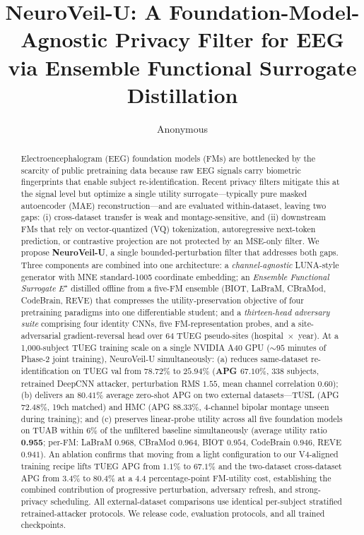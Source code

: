 \documentclass{article}
\title{NeuroVeil-U: A Foundation-Model-Agnostic Privacy Filter for EEG\\via Ensemble Functional Surrogate Distillation}
\author{Anonymous}
\newcommand{\Estar}{E^{\star}}
\begin{document}
\maketitle

\begin{abstract}
Electroencephalogram (EEG) foundation models (FMs) are bottlenecked by the scarcity of public pretraining data because raw EEG signals carry biometric fingerprints that enable subject re-identification. Recent privacy filters mitigate this at the signal level but optimize a single utility surrogate---typically pure masked autoencoder (MAE) reconstruction---and are evaluated within-dataset, leaving two gaps: (i) cross-dataset transfer is weak and montage-sensitive, and (ii) downstream FMs that rely on vector-quantized (VQ) tokenization, autoregressive next-token prediction, or contrastive projection are not protected by an MSE-only filter. We propose \textbf{NeuroVeil-U}, a single bounded-perturbation filter that addresses both gaps. Three components are combined into one architecture: a \emph{channel-agnostic} LUNA-style generator with MNE standard-1005 coordinate embedding; an \emph{Ensemble Functional Surrogate} $\Estar$ distilled offline from a five-FM ensemble (BIOT, LaBraM, CBraMod, CodeBrain, REVE) that compresses the utility-preservation objective of four pretraining paradigms into one differentiable student; and a \emph{thirteen-head adversary suite} comprising four identity CNNs, five FM-representation probes, and a site-adversarial gradient-reversal head over 64 TUEG pseudo-sites (hospital~$\times$~year). At a 1{,}000-subject TUEG training scale on a single NVIDIA A40 GPU ($\sim\!95$ minutes of Phase-2 joint training), NeuroVeil-U simultaneously: (a) reduces same-dataset re-identification on TUEG val from $78.72\%$ to $25.94\%$ (\textbf{APG $\mathbf{67.10\%}$}, 338 subjects, retrained DeepCNN attacker, perturbation RMS $1.55$, mean channel correlation $0.60$); (b) delivers an $\mathbf{80.41\%}$ average zero-shot APG on two external datasets---TUSL (APG $72.48\%$, 19ch matched) and HMC (APG $\mathbf{88.33\%}$, 4-channel bipolar montage unseen during training); and (c) preserves linear-probe utility across all five foundation models on TUAB within $6\%$ of the unfiltered baseline simultaneously (average utility ratio \textbf{0.955}; per-FM: LaBraM $0.968$, CBraMod $0.964$, BIOT $0.954$, CodeBrain $0.946$, REVE $0.941$). An ablation confirms that moving from a light configuration to our V4-aligned training recipe lifts TUEG APG from $1.1\%$ to $67.1\%$ and the two-dataset cross-dataset APG from $3.4\%$ to $80.4\%$ at a $4.4$ percentage-point FM-utility cost, establishing the combined contribution of progressive perturbation, adversary refresh, and strong-privacy scheduling. All external-dataset comparisons use identical per-subject stratified retrained-attacker protocols. We release code, evaluation protocols, and all trained checkpoints.
\end{abstract}
\end{document}
